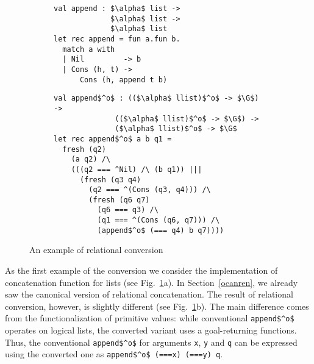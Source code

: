 \begin{figure}[t]
  \begin{subfigure}[t]{0.4\textwidth}
    \begin{lstlisting}[basicstyle=\small]
val append : $\alpha$ list ->
             $\alpha$ list ->
             $\alpha$ list
let rec append = fun a.fun b.
  match a with
  | Nil         -> b
  | Cons (h, t) ->
      Cons (h, append t b)
    \end{lstlisting}
    \vskip1.5cm
    \caption{}
  \end{subfigure}
  \begin{subfigure}[t]{0.6\textwidth}    
    \begin{lstlisting}[basicstyle=\small]
val append$^o$ : (($\alpha$ llist)$^o$ -> $\G$) ->
              (($\alpha$ llist)$^o$ -> $\G$) -> 
              ($\alpha$ llist)$^o$ -> $\G$
let rec append$^o$ a b q1 =
  fresh (q2) 
    (a q2) /\
    (((q2 === ^Nil) /\ (b q1)) |||
      (fresh (q3 q4)
        (q2 === ^(Cons (q3, q4))) /\
        (fresh (q6 q7)
          (q6 === q3) /\             
          (q1 === ^(Cons (q6, q7))) /\
          (append$^o$ (=== q4) b q7))))
    \end{lstlisting}
    \vskip-4mm
    \caption{}
  \end{subfigure}
  \vskip5mm
  \caption{An example of relational conversion}
  \label{relational_conversion_example}
\end{figure}

As the first example of the conversion we consider the implementation of concatenation function for lists (see Fig.~\ref{relational_conversion_example}a).
In Section~\ref{ocanren}, we already saw the canonical version of relational concatenation. The result of relational conversion, however, is slightly different
(see Fig.~\ref{relational_conversion_example}b). The main difference comes from the functionalization of primitive values: while conventional \lstinline|append$^o$| operates
on logical lists, the converted variant uses a goal-returning functions. Thus, the conventional \lstinline{append$^o$} for arguments
\lstinline|x|, \lstinline|y| and \lstinline|q| can be expressed using the converted one as \lstinline{append$^o$ (===x) (===y) q}.

\begin{comment}
With this observation in mind, it is rather easy to understand the rest of the code. First, the value of the first argument is
associated with the fresh variable \lstinline|q2|, and case analysis is performed. If the first argument is an empty list, then the 
value of the third argument is associated with the value of the second (by applying \lstinline|b| to \lstinline|q1|). Otherwise, the first
argument is split into the head \lstinline|q3| and the tail \lstinline|q4|, the tail is functionalized and passed to the recursive
call. The result \lstinline|q7| is consed with the head \lstinline|q3| of the original list and unified with the result \lstinline|q1|. One extra
unification \lstinline|q6 === q3| is an artifact of conversion implementation.
\end{comment}


